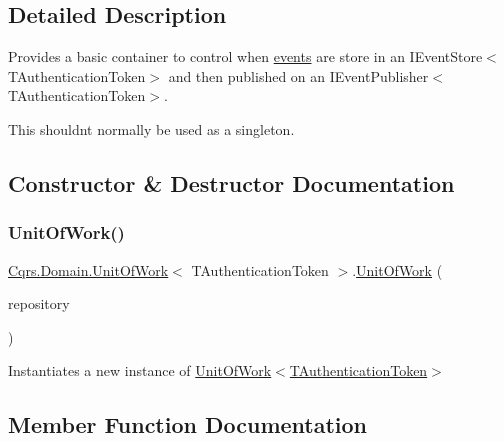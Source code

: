 \subsection{Detailed Description}
Provides a basic container to control when \hyperlink{}{events} are store in an I\+Event\+Store$<$\+T\+Authentication\+Token$>$ and then published on an I\+Event\+Publisher$<$\+T\+Authentication\+Token$>$. 

This shouldn\textquotesingle{}t normally be used as a singleton. 

\subsection{Constructor \& Destructor Documentation}
\mbox{\label{classCqrs_1_1Domain_1_1UnitOfWork_a717facda044d5025e9d7abdec4f54acd_a717facda044d5025e9d7abdec4f54acd}} 
\subsubsection{\texorpdfstring{Unit\+Of\+Work()}{UnitOfWork()}}
{\footnotesize\ttfamily \hyperlink{classCqrs_1_1Domain_1_1UnitOfWork}{Cqrs.\+Domain.\+Unit\+Of\+Work}$<$ T\+Authentication\+Token $>$.\hyperlink{classCqrs_1_1Domain_1_1UnitOfWork}{Unit\+Of\+Work} (\begin{DoxyParamCaption}\item[{\hyperlink{interfaceCqrs_1_1Domain_1_1IAggregateRepository}{I\+Aggregate\+Repository}$<$ T\+Authentication\+Token $>$}]{repository }\end{DoxyParamCaption})}



Instantiates a new instance of \hyperlink{classCqrs_1_1Domain_1_1UnitOfWork_a717facda044d5025e9d7abdec4f54acd_a717facda044d5025e9d7abdec4f54acd}{Unit\+Of\+Work$<$\+T\+Authentication\+Token$>$} 



\subsection{Member Function Documentation}
\mbox{\label{classCqrs_1_1Domain_1_1UnitOfWork_a840214f97d3661c7b5a739df65fadc9f_a840214f97d3661c7b5a739df65fadc9f}} 
